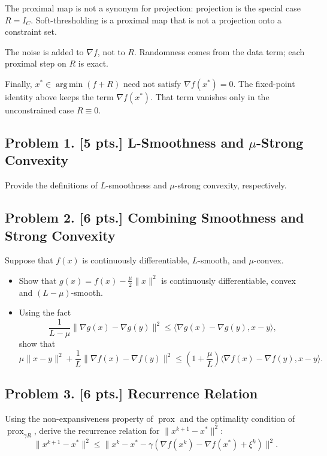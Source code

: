 \documentclass[11pt,a4paper]{article}
\DeclareMathOperator*{\argmin}{arg\,min}
\DeclareMathOperator{\prox}{prox}
\theoremstyle{definition}
\begin{document}
\begin{note}
The proximal map is not a synonym for projection: projection is the special case $R=I_C$. Soft-thresholding is a proximal map that is not a projection onto a constraint set.

The noise is added to $\nabla f$, not to $R$. Randomness comes from the data term; each proximal step on $R$ is exact.

Finally, $x^*\in\argmin(f+R)$ need not satisfy $\nabla f(x^*)=0$. The fixed-point identity above keeps the term $\nabla f(x^*)$. That term vanishes only in the unconstrained case $R\equiv 0$.
\end{note}

\subsection{Problem 1. [5 pts.] L-Smoothness and \texorpdfstring{$\mu$}{mu}-Strong Convexity}\label{prob:spr2025-opt-1}
Provide the definitions of $L$-smoothness and $\mu$-strong convexity, respectively.

\subsection{Problem 2. [6 pts.] Combining Smoothness and Strong Convexity}\label{prob:spr2025-opt-2}
Suppose that $f(x)$ is continuously differentiable, $L$-smooth, and $\mu$-convex.
\begin{itemize}
    \item Show that $g(x) = f(x) - \frac{\mu}{2}\|x\|^2$ is continuously differentiable, convex and $(L - \mu)$-smooth.
    \item Using the fact
    \[
    \frac{1}{L - \mu} \|\nabla g(x) - \nabla g(y)\|^2 \le \langle \nabla g(x) - \nabla g(y), x - y \rangle,
    \]
    show that
    \[
    \mu \|x - y\|^2 + \frac{1}{L} \|\nabla f(x) - \nabla f(y)\|^2 \le \left(1 + \frac{\mu}{L}\right) \langle \nabla f(x) - \nabla f(y), x - y \rangle.
    \]
\end{itemize}

\subsection{Problem 3. [6 pts.] Recurrence Relation}\label{prob:spr2025-opt-3}
Using the non-expansiveness property of $\prox$ and the optimality condition of $\prox_{\gamma R}$, derive the recurrence relation for $\|x^{k+1} - x^*\|^2$:
\[
\|x^{k+1} - x^*\|^2 \le \|x^k - x^* - \gamma (\nabla f(x^k) - \nabla f(x^*) + \xi^k)\|^2.
\]
\end{document}
